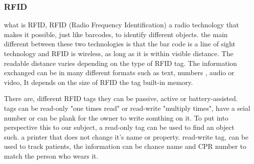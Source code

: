 \subsubsection{RFID}


what is RFID, RFID (Radio Frequency Identification) a radio technology that makes it possible, just like barcodes, to identify different objects. the main different between these two technologies is that the bar code is a line of sight technology and RFID is wireless, as long as it is within visible distance. The readable distance varies depending on the type of RFID tag. The information exchanged can be in many different formats such as text, numbers , audio or video, It depends on the size of RFID the tag built-in memory. 

There are, different RFID tags they can be passive, active or battery-assisted. tags can be read-only "one times read" or read-write "multiply times", have a seial number or can be plank for the owner to write somthing on it. To put into perspective this to our subject, a read-only tag can be used to find an object such. a printer that does not change it's name or property. read-write tag, can be used to track patients, the information can be chance name and CPR number to match the person who wears it.  
